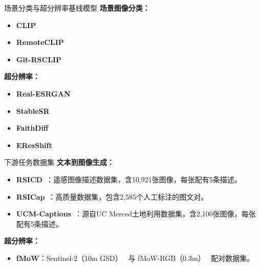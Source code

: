   
\begin{refsection}
  \begin{frame}{场景分类与超分辨率基线模型}
    \textbf{场景图像分类：}
    \begin{itemize}
      \item \textbf{CLIP}~\parencite{radfordLearningTransferableVisual2021}
      \item \textbf{RemoteCLIP}~\parencite{liuRemoteCLIPVisionLanguage2024}
      \item \textbf{Git-RSCLIP}~\parencite{text2earth2025}
    \end{itemize}
    \textbf{超分辨率：}
    \begin{itemize}
      \item \textbf{Real-ESRGAN}~\parencite{wangRealESRGANTrainingRealWorld2021b}
      \item \textbf{StableSR}~\parencite{wangExploitingDiffusionPrior2024}
      \item \textbf{FaithDiff}~\parencite{chenFaithDiffUnleashingDiffusion2024}
      \item \textbf{EResShift}~\parencite{yueEfficientDiffusionModel2025}
    \end{itemize}
    \bottomleftrefs
  \end{frame}
  \end{refsection}

\begin{refsection}
  \begin{frame}{下游任务数据集}
    \textbf{文本到图像生成：}
    \begin{itemize}
      \item \textbf{RSICD}~\parencite{lu2017exploring}：遥感图像描述数据集，含10,921张图像，每张配有5条描述。
      \item \textbf{RSICap}~\parencite{hu2023rsgpt}：高质量数据集，包含2,585个人工标注的图文对。
      \item \textbf{UCM-Captions}~\parencite{qu2016deep}：源自UC Merced土地利用数据集，含2,100张图像，每张配有5条描述。
    \end{itemize}
    \vspace{1em}
    \textbf{超分辨率：}
    \begin{itemize}
      \item \textbf{fMoW}：Sentinel-2（10m GSD）~\parencite{congFunctionalMapWorld2022} 与 fMoW-RGB（0.3m）~\parencite{christieFunctionalMapWorld2018} 配对数据集。
    \end{itemize}
    \bottomleftrefs
  \end{frame}
  \end{refsection}

